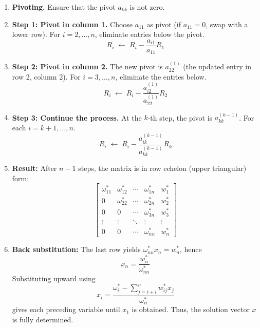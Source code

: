 \documentclass[../../../main.tex]{subfiles}
\begin{document}
\begin{enumerate}
    \item \textbf{Pivoting.} Ensure that the pivot $a_{kk}$ is not zero.
    \item \textbf{Step 1: Pivot in column 1.}
          Choose $a_{11}$ as pivot (if $a_{11}=0$, swap with a lower row).
          For $i=2,\dots,n$, eliminate entries below the pivot.
          \begin{equation*}
              R_i \;\leftarrow\; R_i - \frac{a_{i1}}{a_{11}} R_1
          \end{equation*}
    \item \textbf{Step 2: Pivot in column 2.}
          The new pivot is $a_{22}^{(1)}$ (the updated entry in row 2, column 2).
          For $i=3,\dots,n$, eliminate the entries below.
          \begin{equation*}
              R_i \;\leftarrow\; R_i - \frac{a_{i2}^{(1)}}{a_{22}^{(1)}} R_2
          \end{equation*}
    \item \textbf{Step 3: Continue the process.}  At the $k$-th step, the pivot is $a_{kk}^{(k-1)}$.
          For each $i = k+1, \dots, n$.
          \begin{equation*}
              R_i \;\leftarrow\; R_i - \frac{a_{ik}^{(k-1)}}{a_{kk}^{(k-1)}} R_k
          \end{equation*}
    \item \textbf{Result:}
          After $n-1$ steps, the matrix is in row echelon (upper triangular) form:
          \[
              \begin{bmatrix}
                  \omega_{11}^{*} & \omega_{12}^{*} & \cdots & \omega_{1n}^{*} & w_1^{*} \\
                  0               & \omega_{22}^{*} & \cdots & \omega_{2n}^{*} & w_2^{*} \\
                  0               & 0               & \cdots & \omega_{3n}^{*} & w_3^{*} \\
                  \vdots          & \vdots          & \ddots & \vdots          & \vdots  \\
                  0               & 0               & \cdots & \omega_{nn}^{*} & w_n^{*}
              \end{bmatrix}
          \]

    \item \textbf{Back substitution:}
          The last row yields $\omega_{nn}^{*} x_n = w_n^{*}$, hence
          \[
              x_n = \frac{w_n^{*}}{\omega_{nn}^{*}}
          \]
          Substituting upward using
          \begin{equation*}
              x_i =\frac{\omega_i ^* -\sum_{j=i+i }^{n }w_{ij}^*x_j}{\omega_{ii }^*}
          \end{equation*}
          gives each preceding variable until $x_1$ is obtained.
          Thus, the solution vector $x$ is fully determined.
\end{enumerate}
\end{document}
